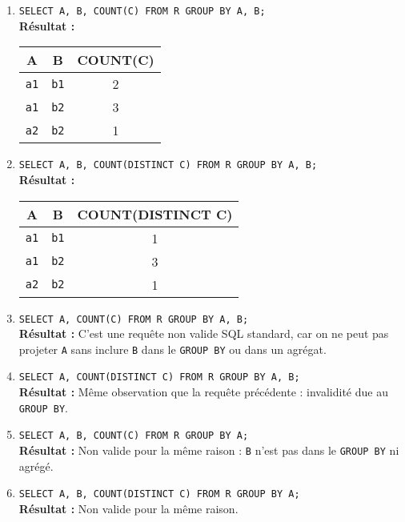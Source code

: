\documentclass[11pt]{article}
\begin{document}
\begin{enumerate}
  \item \texttt{SELECT A, B, COUNT(C) FROM R GROUP BY A, B;}\\
    \textbf{Résultat :}
    \begin{tabular}{c|c|c}
    A & B & COUNT(C) \\
    \hline
    \texttt{a1} & \texttt{b1} & 2\\
    \texttt{a1} & \texttt{b2} & 3\\
    \texttt{a2} & \texttt{b2} & 1\\
    \end{tabular}

  \item \texttt{SELECT A, B, COUNT(DISTINCT C) FROM R GROUP BY A, B;}\\
    \textbf{Résultat :}
    \begin{tabular}{c|c|c}
    A & B & COUNT(DISTINCT C) \\
    \hline
    \texttt{a1} & \texttt{b1} & 1\\
    \texttt{a1} & \texttt{b2} & 3\\
    \texttt{a2} & \texttt{b2} & 1\\
    \end{tabular}

  \item \texttt{SELECT A, COUNT(C) FROM R GROUP BY A, B;}\\
    \textbf{Résultat :}\newline
    C'est une requête non valide SQL standard, car on ne peut pas projeter \texttt{A} sans inclure \texttt{B} dans le \texttt{GROUP BY} ou dans un agrégat.

  \item \texttt{SELECT A, COUNT(DISTINCT C) FROM R GROUP BY A, B;}\\
    \textbf{Résultat :}\newline
    Même observation que la requête précédente : invalidité due au \texttt{GROUP BY}.

  \item \texttt{SELECT A, B, COUNT(C) FROM R GROUP BY A;}\\
    \textbf{Résultat :}\newline
    Non valide pour la même raison : \texttt{B} n'est pas dans le \texttt{GROUP BY} ni agrégé.

  \item \texttt{SELECT A, B, COUNT(DISTINCT C) FROM R GROUP BY A;}\\
    \textbf{Résultat :}\newline
    Non valide pour la même raison.
\end{enumerate}
\end{document}
